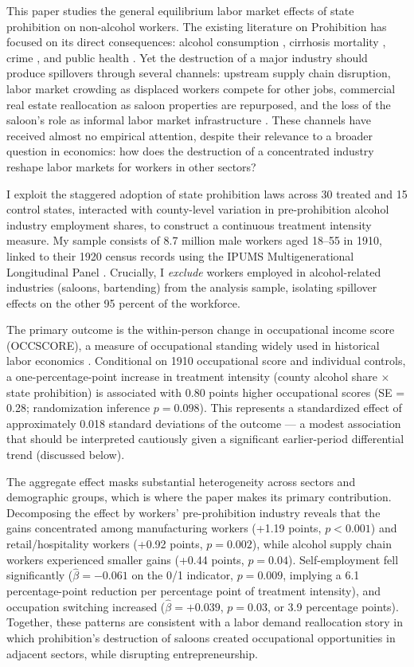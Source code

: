\documentclass[12pt]{article}
\begin{document}
This paper studies the general equilibrium labor market effects of state prohibition on non-alcohol workers. The existing literature on Prohibition has focused on its direct consequences: alcohol consumption \citep{miron2004}, cirrhosis mortality \citep{dills2005}, crime \citep{owens2014, asbridge2004}, and public health \citep{blocker2006}. Yet the destruction of a major industry should produce spillovers through several channels: upstream supply chain disruption, labor market crowding as displaced workers compete for other jobs, commercial real estate reallocation as saloon properties are repurposed, and the loss of the saloon's role as informal labor market infrastructure \citep{powers1998}. These channels have received almost no empirical attention, despite their relevance to a broader question in economics: how does the destruction of a concentrated industry reshape labor markets for workers in other sectors?

I exploit the staggered adoption of state prohibition laws across 30 treated and 15 control states, interacted with county-level variation in pre-prohibition alcohol industry employment shares, to construct a continuous treatment intensity measure. My sample consists of 8.7 million male workers aged 18--55 in 1910, linked to their 1920 census records using the IPUMS Multigenerational Longitudinal Panel \citep{ruggles2021, abramitzky2021}. Crucially, I \emph{exclude} workers employed in alcohol-related industries (saloons, bartending) from the analysis sample, isolating spillover effects on the other 95 percent of the workforce.

The primary outcome is the within-person change in occupational income score (OCCSCORE), a measure of occupational standing widely used in historical labor economics \citep{abramitzky2012, ward2023}. Conditional on 1910 occupational score and individual controls, a one-percentage-point increase in treatment intensity (county alcohol share $\times$ state prohibition) is associated with 0.80 points higher occupational scores (SE = 0.28; randomization inference $p = 0.098$). This represents a standardized effect of approximately 0.018 standard deviations of the outcome --- a modest association that should be interpreted cautiously given a significant earlier-period differential trend (discussed below).

The aggregate effect masks substantial heterogeneity across sectors and demographic groups, which is where the paper makes its primary contribution. Decomposing the effect by workers' pre-prohibition industry reveals that the gains concentrated among manufacturing workers (+1.19 points, $p < 0.001$) and retail/hospitality workers (+0.92 points, $p = 0.002$), while alcohol supply chain workers experienced smaller gains (+0.44 points, $p = 0.04$). Self-employment fell significantly ($\hat{\beta} = -0.061$ on the 0/1 indicator, $p = 0.009$, implying a 6.1 percentage-point reduction per percentage point of treatment intensity), and occupation switching increased ($\hat{\beta} = +0.039$, $p = 0.03$, or 3.9 percentage points). Together, these patterns are consistent with a labor demand reallocation story in which prohibition's destruction of saloons created occupational opportunities in adjacent sectors, while disrupting entrepreneurship.
\end{document}
